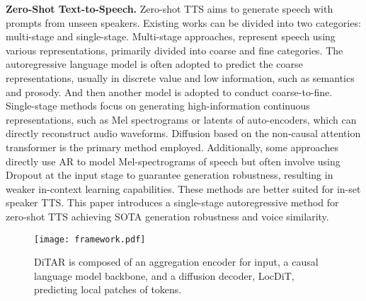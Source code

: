 \textbf{Zero-Shot Text-to-Speech.} Zero-shot TTS aims to generate speech with prompts from unseen speakers.
Existing works can be divided into two categories: multi-stage and single-stage.
Multi-stage approaches\cite{chen2024vall,chen2025neural,lee2023hierspeech++,jiang2023mega,jiang2023boosting,anastassiou2024seed}, represent speech using various representations, primarily divided into coarse and fine categories. 
The autoregressive language model is often adopted to predict the coarse representations, usually in discrete value and low information, such as semantics\cite{kharitonov2023speak,anastassiou2024seed,hsu2021hubert,chung2021w2v,baevski2020wav2vec} and prosody\cite{jiang2023mega,jiang2023boosting,ju2024naturalspeech}. And then another model is adopted to conduct coarse-to-fine. 
Single-stage methods focus on generating high-information continuous representations, such as Mel spectrograms or latents of auto-encoders, which can directly reconstruct audio waveforms.
Diffusion based on the non-causal attention transformer is the primary method employed\cite{chen2024f5,eskimez2024e2,gao2023e3,le2024voicebox}.
Additionally, some approaches\cite{meng2024autoregressive,wang2017tacotron,shen2018natural,li2019neural} directly use AR to model Mel-spectrograms of speech but often involve using Dropout\cite{srivastava2014dropout} at the input stage to guarantee generation robustness, resulting in weaker in-context learning capabilities. These methods are better suited for in-set speaker TTS.
This paper introduces a single-stage autoregressive method for zero-shot TTS achieving SOTA generation robustness and voice similarity.


\begin{figure*}[t]
  \centering
  \texttt{[image: framework.pdf]}
  \caption{DiTAR is composed of an aggregation encoder for input, a causal language model backbone, and a diffusion decoder, LocDiT, predicting local patches of tokens.}
  \label{fig:ditar}
  \vspace{-0.3cm}
\end{figure*}